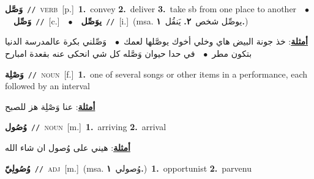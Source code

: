 \documentclass[10pt,a4paper,twoside]{article} %
\begin{document}
\begin{multicols}{2}
{\setlength\topsep{0pt}\textbf{\foreignlanguage{arabic}{وَصَّل}}\ {\color{gray}\texttt{//}\color{black}}\ \textsc{verb}\ [p.]\ \textbf{1.}~convey  \textbf{2.}~deliver  \textbf{3.}~take sb from one place to another\ \ $\bullet$\ \ \setlength\topsep{0pt}\textbf{\foreignlanguage{arabic}{وَصِّل}}\ {\color{gray}\texttt{//}\color{black}}\ [c.]\ \ $\bullet$\ \ \setlength\topsep{0pt}\textbf{\foreignlanguage{arabic}{يوَصِّل}}\ {\color{gray}\texttt{//}\color{black}}\ [i.]\ \color{gray}(msa. \foreignlanguage{arabic}{يوصِّل شخص}~\foreignlanguage{arabic}{\textbf{٢.}}  \foreignlanguage{arabic}{يَنقُل}~\foreignlanguage{arabic}{\textbf{١.}})\color{black}\  \begin{flushright}\color{gray}\foreignlanguage{arabic}{\textbf{\underline{\foreignlanguage{arabic}{أمثلة}}}: خذ جونة البيض هاي وخلي أخوك يوصَّلها لعمك\ $\bullet$\ \  وَصِّلني بكرة عالمدرسة الدنيا بتكون مطر\ $\bullet$\ \  في حدا حيوان وَصَّله كل شي انحكى عنه بقعدة امبارح}\end{flushright}\color{black}} \vspace{2mm}

{\setlength\topsep{0pt}\textbf{\foreignlanguage{arabic}{وَصْلِة}}\ {\color{gray}\texttt{//}\color{black}}\ \textsc{noun}\ [f.]\ \textbf{1.}~one of several songs or other items in a performance, each followed by an interval\  \begin{flushright}\color{gray}\foreignlanguage{arabic}{\textbf{\underline{\foreignlanguage{arabic}{أمثلة}}}: عنا وَصْلِة هز للصبح}\end{flushright}\color{black}} \vspace{2mm}

{\setlength\topsep{0pt}\textbf{\foreignlanguage{arabic}{وُصُول}}\ {\color{gray}\texttt{//}\color{black}}\ \textsc{noun}\ [m.]\ \textbf{1.}~arriving  \textbf{2.}~arrival\  \begin{flushright}\color{gray}\foreignlanguage{arabic}{\textbf{\underline{\foreignlanguage{arabic}{أمثلة}}}: هيني على وُصول ان شاء الله}\end{flushright}\color{black}} \vspace{2mm}

{\setlength\topsep{0pt}\textbf{\foreignlanguage{arabic}{وُصُولِيّ}}\ {\color{gray}\texttt{//}\color{black}}\ \textsc{adj}\ [m.]\ \color{gray}(msa. \foreignlanguage{arabic}{وُصولي}~\foreignlanguage{arabic}{\textbf{١.}})\color{black}\ \textbf{1.}~opportunist  \textbf{2.}~parvenu\ } \vspace{2mm}


\end{multicols}
\end{document}
